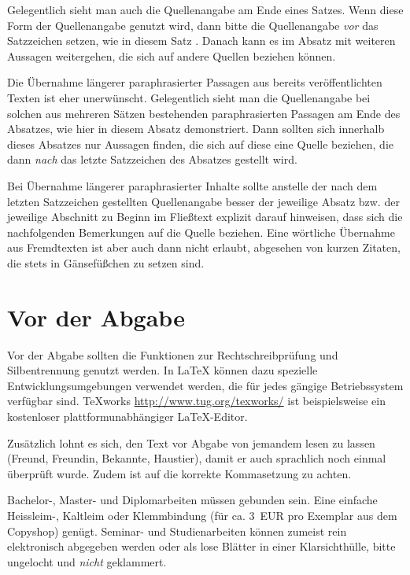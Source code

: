 \documentclass[
    fontsize=12pt,
    headings=small,
    parskip=half,           %
    bibliography=totoc,
    numbers=noenddot,       %
    open=any,               %
    ]{scrreprt}
\begin{document}
Gelegentlich sieht man auch die Quellenangabe am Ende eines Satzes. Wenn diese Form der Quellenangabe genutzt wird, dann bitte die Quellenangabe \emph{vor} das Satzzeichen setzen, wie in diesem Satz \cite{XYZ}. Danach kann es im Absatz mit weiteren Aussagen weitergehen, die sich auf andere Quellen beziehen können.

Die Übernahme längerer paraphrasierter Passagen aus bereits veröffentlichten Texten ist eher unerwünscht. Gelegentlich sieht man die Quellenangabe bei solchen aus mehreren Sätzen bestehenden paraphrasierten Passagen am Ende des Absatzes, wie hier in diesem Absatz demonstriert. Dann sollten sich innerhalb dieses Absatzes nur Aussagen finden, die sich auf diese eine Quelle beziehen, die dann \emph{nach} das letzte Satzzeichen des Absatzes gestellt wird. \cite{XYZ}

Bei Übernahme längerer paraphrasierter Inhalte sollte anstelle der nach dem letzten Satzzeichen gestellten Quellenangabe besser der jeweilige Absatz bzw. der jeweilige Abschnitt zu Beginn im Fließtext explizit darauf hinweisen, dass sich die nachfolgenden Bemerkungen auf die Quelle \cite{XYZ} beziehen. Eine wörtliche Übernahme aus Fremdtexten ist aber auch dann nicht erlaubt, abgesehen von kurzen Zitaten, die stets in Gänsefüßchen zu setzen sind.

\section{Vor der Abgabe}

Vor der Abgabe sollten die Funktionen zur Rechtschreibprüfung und Silbentrennung genutzt werden. In LaTeX können dazu spezielle Entwicklungsumgebungen verwendet werden, die für jedes gängige Betriebssystem verfügbar sind. TeXworks \url{http://www.tug.org/texworks/} ist beispielsweise ein kostenloser plattformunabhängiger LaTeX-Editor.

Zusätzlich lohnt es sich, den Text vor Abgabe von jemandem lesen zu lassen (Freund, Freundin, Bekannte, Haustier), damit er auch sprachlich noch einmal überprüft wurde. Zudem ist auf die korrekte Kommasetzung zu achten.

Bachelor-, Master- und Diplomarbeiten müssen gebunden sein. Eine einfache Heissleim-, Kaltleim oder Klemmbindung (für ca. 3~EUR pro Exemplar aus dem Copyshop) genügt. Seminar- und Studienarbeiten können zumeist rein elektronisch abgegeben werden oder als lose Blätter in einer Klarsichthülle, bitte ungelocht und \emph{nicht} geklammert.
\end{document}
